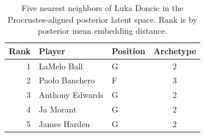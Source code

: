 \begin{table}[htbp]
  \centering\small
  \begin{tabular}{rllc}
    \toprule
    Rank & Player & Position & Archetype \\
    \midrule
    1 & LaMelo Ball & G & 2 \\
    2 & Paolo Banchero & F & 3 \\
    3 & Anthony Edwards & G & 2 \\
    4 & Ja Morant & G & 2 \\
    5 & James Harden & G & 2 \\
    \bottomrule
  \end{tabular}
  \caption{Five nearest neighbors of Luka Doncic in the Procrustes-aligned posterior latent space. Rank is by posterior mean embedding distance.}
  \label{tab:Luka_Doncic_neighbors}
\end{table}

